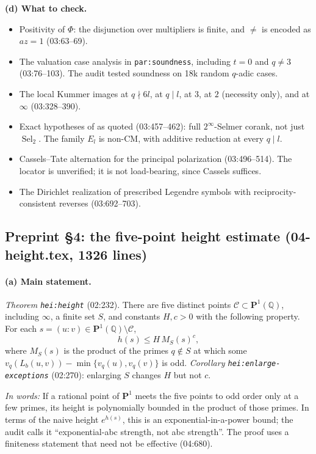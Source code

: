 \documentclass[11pt]{article}
\theoremstyle{definition}
\newcommand{\Q}{\mathbb Q}
\newcommand{\PP}{\mathbf P}
\newcommand{\Cpts}{\mathcal C}
\newcommand{\lbl}[1]{\texttt{#1}}
\newcommand{\src}[1]{\textsf{#1}}
\newcommand{\inwords}[1]{\par\smallskip\noindent\emph{In words:} #1\par}
\DeclareMathOperator{\Sel}{Sel}
\newcommand{\checkhead}{\par\smallskip\noindent\textbf{(d) What to check.}\ }
\begin{document}
\checkhead
\begin{itemize}
\item Positivity of $\Phi$: the disjunction over multipliers is finite, and
$\neq$ is encoded as $az=1$ (\src{03:63--69}).
\item The valuation case analysis in \lbl{par:soundness}, including $t=0$
and $q\ne3$ (\src{03:76--103}).  The audit tested soundness on 18k random
$q$-adic cases.
\item The local Kummer images at $q\nmid 6l$, at $q\mid l$, at $3$, at $2$
(necessity only), and at $\infty$ (\src{03:328--390}).
\item Exact hypotheses of \cite[Thm.~1.1]{PointwiseTwoConverse} as quoted
(\src{03:457--462}): full $2^\infty$-Selmer corank, not just $\Sel_2$.
The family $E_l$ is non-CM, with additive reduction at every $q\mid l$.
\item Cassels--Tate alternation for the principal polarization
(\src{03:496--514}).  The locator \cite[Cor.~9]{PoonenStoll1999} is
unverified; it is not load-bearing, since Cassels \cite{Cassels1962}
suffices.
\item The Dirichlet realization of prescribed Legendre symbols with
reciprocity-consistent reverses (\src{03:692--703}).
\end{itemize}

\subsection{Preprint \S4: the five-point height estimate (\src{04-height.tex}, 1326 lines)}

\paragraph{(a) Main statement.}
\emph{Theorem \lbl{hei:height}} (\src{02:232}).  There are five distinct
points $\Cpts\subset\PP^1(\Q)$, including $\infty$, a finite set $S$, and
constants $H,c>0$ with the following property.  For each
$s=(u:v)\in\PP^1(\Q)\setminus\Cpts$,
\[
 h(s)\le H\,M_S(s)^c,
\]
where $M_S(s)$ is the product of the primes $q\notin S$ at which some
$v_q(L_b(u,v))-\min\{v_q(u),v_q(v)\}$ is odd.
\emph{Corollary \lbl{hei:enlarge-exceptions}} (\src{02:270}): enlarging
$S$ changes $H$ but not $c$.

\inwords{If a rational point of $\PP^1$ meets the five points to odd order
only at a few primes, its height is polynomially bounded in the product of
those primes.  In terms of the naive height $e^{h(s)}$, this is an
exponential-in-a-power bound; the audit calls it ``exponential-abc
strength, not abc strength''.  The proof uses a finiteness statement that
need not be effective (\src{04:680}).}
\end{document}

